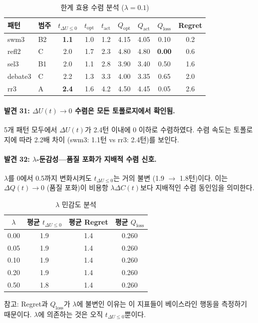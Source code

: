 \documentclass[a4paper,11pt]{article}
\begin{document}
\begin{table}[H]
\centering
\caption{한계 효용 수렴 분석 ($\lambda=0.1$)}
\label{tab:marginal-utility}
{\small
\begin{tabular}{llccccccc}
\toprule
패턴 & 범주 & $t_{\Delta U \leq 0}$ & $t_{\text{opt}}$ & $t_{\text{act}}$ & $Q_{\text{opt}}$ & $Q_{\text{act}}$ & $Q_{\text{loss}}$ & Regret \\
\midrule
swm3    & B2 & \textbf{1.1} & 1.0 & 1.2 & 4.15 & 4.05 & 0.10 & 0.2 \\
refl2   & C  & 2.0          & 1.7 & 2.3 & 4.80 & 4.80 & \textbf{0.00} & 0.6 \\
sel3    & B1 & 2.0          & 1.1 & 2.8 & 3.90 & 3.40 & 0.50 & 1.6 \\
debate3 & C  & 2.2          & 1.3 & 3.3 & 4.00 & 3.35 & 0.65 & 2.0 \\
rr3     & A  & \textbf{2.4} & 1.6 & 4.2 & 4.50 & 4.45 & 0.05 & 2.6 \\
\bottomrule
\end{tabular}
}
\end{table}

\paragraph{발견 31: $\Delta U(t) \to 0$ 수렴은 모든 토폴로지에서 확인됨.}
5개 패턴 모두에서 $\Delta U(t)$가 2.4턴 이내에 0 이하로 수렴하였다. 수렴 속도는 토폴로지에 따라 2.2배 차이 (swm3: 1.1턴 vs rr3: 2.4턴)를 보인다.

\paragraph{발견 32: $\lambda$-둔감성---품질 포화가 지배적 수렴 신호.}
$\lambda$를 0에서 0.5까지 변화시켜도 $t_{\Delta U \leq 0}$는 거의 불변 (1.9 $\to$ 1.8턴)이다. 이는 $\Delta Q(t) \to 0$ (품질 포화)이 비용항 $\lambda \Delta C(t)$보다 지배적인 수렴 동인임을 의미한다.

\begin{table}[H]
\centering
\caption{$\lambda$ 민감도 분석}
\label{tab:lambda-sensitivity}
{\small
\begin{tabular}{cccc}
\toprule
$\lambda$ & 평균 $t_{\Delta U \leq 0}$ & 평균 Regret & 평균 $Q_{\text{loss}}$ \\
\midrule
0.00 & 1.9 & 1.4 & 0.260 \\
0.05 & 1.9 & 1.4 & 0.260 \\
0.10 & 1.9 & 1.4 & 0.260 \\
0.20 & 1.9 & 1.4 & 0.260 \\
0.50 & 1.8 & 1.4 & 0.260 \\
\bottomrule
\end{tabular}
}

\smallskip
{\footnotesize 참고: Regret과 $Q_{\text{loss}}$가 $\lambda$에 불변인 이유는 이 지표들이 베이스라인 행동을 측정하기 때문이다. $\lambda$에 의존하는 것은 오직 $t_{\Delta U \leq 0}$뿐이다.}
\end{table}
\end{document}
